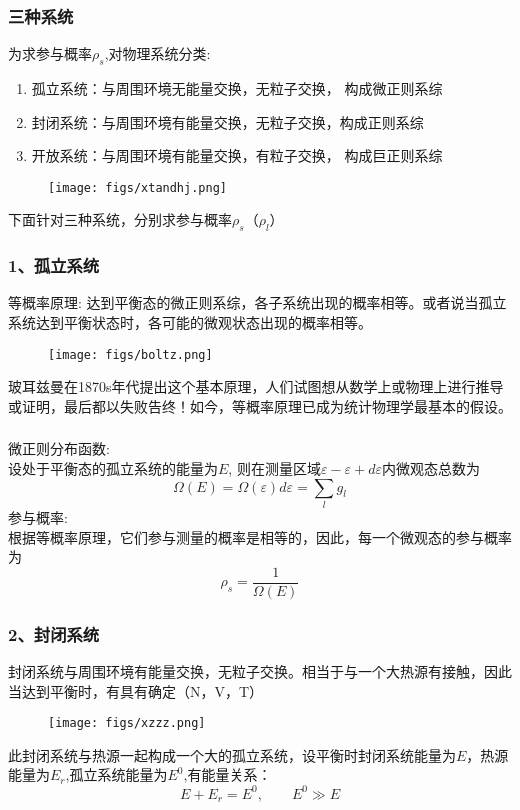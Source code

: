 \begin{frame}
  \frametitle{三种系统}
  为求参与概率$\rho _s$,对物理系统分类:
\begin{enumerate}
  \item 孤立系统：与周围环境无能量交换，无粒子交换， 构成微正则系综  
  \item 封闭系统：与周围环境有能量交换，无粒子交换，构成正则系综 
  \item 开放系统：与周围环境有能量交换，有粒子交换， 构成巨正则系综 
\end{enumerate}
\begin{figure}[htbp]
  \centering
  \texttt{[image: figs/xtandhj.png]}
\end{figure}
下面针对三种系统，分别求参与概率$\rho _s$（$\rho _l$）
\end{frame} 

\begin{frame}
  \frametitle{ 1、孤立系统}
  \alert{等概率原理:}  达到平衡态的微正则系综，各子系统出现的概率相等。或者说当孤立系统达到平衡状态时，各可能的微观状态出现的概率相等。
  \begin{figure}[htbp]
    \centering
    \texttt{[image: figs/boltz.png]}
  \end{figure}
  玻耳兹曼在1870s年代提出这个基本原理，人们试图想从数学上或物理上进行推导或证明，最后都以失败告终！如今，等概率原理已成为统计物理学最基本的假设。
\end{frame} 


\begin{frame}
  \frametitle{}
  \alert{微正则分布函数:} \\ 
  设处于平衡态的孤立系统的能量为$E$, 则在测量区域$\varepsilon - \varepsilon+ d\varepsilon $内微观态总数为
  $$
  \Omega(E) = \Omega(\varepsilon)  d \varepsilon = \sum_l g_l 
  $$ 
  \alert{参与概率:} \\
  根据等概率原理，它们参与测量的概率是相等的，因此，每一个微观态的参与概率为
  \[ \rho _s = \frac{1}{\Omega(E)} \]
\end{frame} 

\begin{frame}
  \frametitle{ 2、封闭系统}
  封闭系统与周围环境有能量交换，无粒子交换。相当于与一个大热源有接触，因此当达到平衡时，有具有确定（N，V，T）
  \begin{figure}[htbp]
    \centering
    \texttt{[image: figs/xzzz.png]}
  \end{figure}
  此封闭系统与热源一起构成一个大的孤立系统，设平衡时封闭系统能量为$E$，热源能量为$E_r$,孤立系统能量为$E^0$,有能量关系：
  \[ E + E_r = E^0, \qquad E^0 \gg E\] 
\end{frame} 

